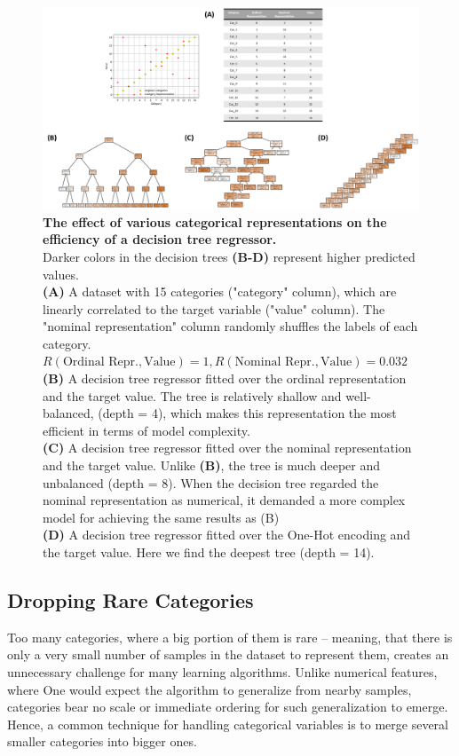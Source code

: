 \documentclass{article}
\begin{document}
\begin{figure}
\includegraphics[width=\textwidth]{imgs/figure1}

\caption{\label{figure:fig1}
\textbf{The effect of various categorical representations on the efficiency of a decision tree regressor.} \\
Darker colors in the decision trees \textbf{(B-D)} represent higher predicted values.\\
\textbf{(A)} A dataset with 15 categories ("category" column), which are linearly correlated to the target variable ("value" column). The "nominal representation" column randomly shuffles the labels of each category. $R(\text{Ordinal Repr.}, \text{Value})=1, R(\text{Nominal Repr.}, \text{Value})=0.032$ \\
\textbf{(B)} A decision tree regressor fitted over the ordinal representation and the target value. The tree is relatively shallow and well-balanced, (depth = 4), which makes this representation the most efficient in terms of model complexity. \\
\textbf{(C)} A decision tree regressor fitted over the nominal representation and the target value. Unlike \textbf{(B)}, the tree is much deeper and unbalanced (depth = 8). When the decision tree regarded the nominal representation as numerical, it demanded a more complex model for achieving the same results as (B) \\
\textbf{(D)} A decision tree regressor fitted over the One-Hot encoding and the target value. Here we find the deepest tree (depth = 14). \\
}
\end{figure}

\subsection{Dropping Rare Categories}
Too many categories, where a big portion of them is rare -- meaning, that there is only a very small number of samples in the dataset to represent them, creates an unnecessary challenge for many learning algorithms. Unlike numerical features, where One would expect the algorithm to generalize from nearby samples, categories bear no scale or immediate ordering for such generalization to emerge. Hence, a common technique for handling categorical variables is to merge several smaller categories into bigger ones. 
\end{document}
